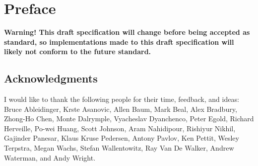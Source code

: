 \chapter{Preface}

{\bf Warning! This draft specification will change before being accepted as
standard, so implementations made to this draft specification will likely not
conform to the future standard.}


\section*{Acknowledgments}

I would like to thank the following people for their time, feedback, and ideas:
Bruce Ableidinger,
Krste Asanovic,
Allen Baum,
Mark Beal,
Alex Bradbury,
Zhong-Ho Chen,
Monte Dalrymple,
Vyacheslav Dyanchenco,
Peter Egold,
Richard Herveille,
Po-wei Huang,
Scott Johnson,
Aram Nahidipour,
Rishiyur Nikhil,
Gajinder Panesar,
Klaus Kruse Pedersen,
Antony Pavlov,
Ken Pettit,
Wesley Terpstra,
Megan Wachs,
Stefan Wallentowitz,
Ray Van De Walker,
Andrew Waterman,
and Andy Wright.
